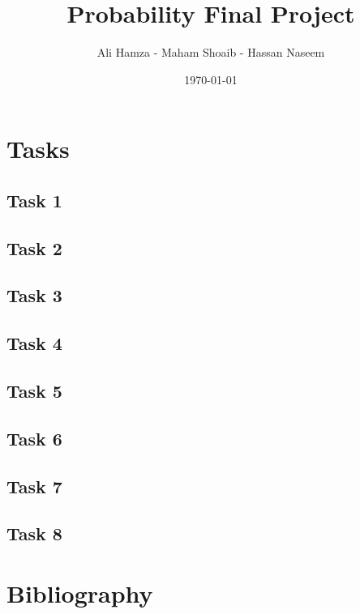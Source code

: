 \documentclass{article}
\title{Probability Final Project}
\author{Ali Hamza - Maham Shoaib - Hassan Naseem}
\date{\today}
\begin{document}
\maketitle

\section{Tasks}
\subsection{Task 1}
\subsection{Task 2}
\subsection{Task 3}
\subsection{Task 4}
\subsection{Task 5}
\subsection{Task 6}
\subsection{Task 7}
\subsection{Task 8}
\section{Bibliography}
\end{document}
